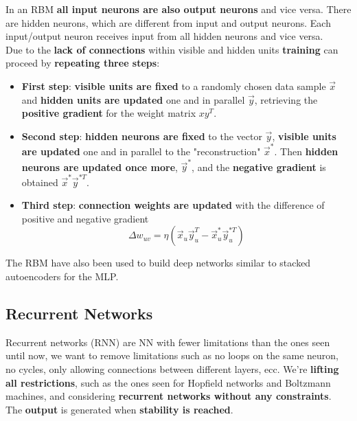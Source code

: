 In an RBM \textbf{all input neurons are also output neurons} and vice versa. There are hidden neurons, which are different from input and output neurons. Each input/output neuron receives input from all hidden neurons and vice versa.\\

Due to the \textbf{lack of connections} within visible and hidden units \textbf{training} can proceed by \textbf{repeating three steps}: 
\begin{itemize}
	\item \textbf{First step}: \textbf{visible units are fixed} to a randomly chosen data sample $\vec{x}$ and \textbf{hidden units are updated} one and in parallel $\vec{y}$, retrieving the \textbf{positive gradient} for the weight matrix $xy^T$.\\
	
	\item \textbf{Second step}: \textbf{hidden neurons are fixed} to the vector $\vec{y}$, \textbf{visible units are updated} one and in parallel to the "reconstruction" $\vec{x}^\ast$. Then \textbf{hidden neurons are updated once more}, $\vec{y}^\ast$, and the \textbf{negative gradient} is obtained $\vec{x}^\ast \vec{y}^{\ast T}$.\\
	
	\item \textbf{Third step}: \textbf{connection weights are updated} with the difference of positive and negative gradient
	$$ \Delta w_{uv} = \eta \left( \vec{x}_u \vec{y}_u^T - \vec{x}^\ast_u \vec{y}^{\ast T}_u \right)$$
\end{itemize}

The RBM have also been used to build deep networks similar to stacked autoencoders for the MLP.\\


\subsection{Recurrent Networks}
Recurrent networks (RNN) are NN with fewer limitations than the ones seen until now, we want to remove limitations such as no loops on the same neuron, no cycles, only allowing connections between different layers, ecc. We're \textbf{lifting all restrictions}, such as the ones seen for Hopfield networks and Boltzmann machines, and considering \textbf{recurrent networks without any constraints}.\\

The \textbf{output} is generated when \textbf{stability is reached}.\\

